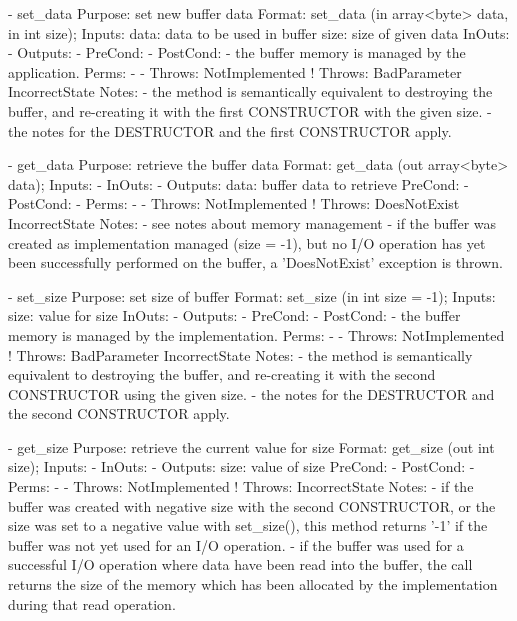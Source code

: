 \begin{myspec}
 
    - set_data
      Purpose:  set new buffer data
      Format:   set_data             (in  array<byte> data, 
                                      in  int         size);
      Inputs:   data:                 data to be used in buffer
                size:                 size of given data
      InOuts:   -
      Outputs:  -
      PreCond:  -
      PostCond: - the buffer memory is managed by the
                  application.
      Perms:    -
-     Throws:   NotImplemented
!     Throws:   BadParameter
                IncorrectState
      Notes:    - the method is semantically equivalent to
                  destroying the buffer, and re-creating it with
                  the first CONSTRUCTOR with the given size.
                - the notes for the DESTRUCTOR and the first
                  CONSTRUCTOR apply.
 
 
    - get_data
      Purpose:  retrieve the buffer data
      Format:   get_data             (out array<byte> data);
      Inputs:   -
      InOuts:   -
      Outputs:  data:                 buffer data to retrieve
      PreCond:  -
      PostCond: -
      Perms:    -
-     Throws:   NotImplemented
!     Throws:   DoesNotExist
                IncorrectState
      Notes:    - see notes about memory management
                - if the buffer was created as implementation
                  managed (size = -1), but no I/O operation has
                  yet been successfully performed on the buffer,
                  a 'DoesNotExist' exception is thrown.
 
 
    - set_size
      Purpose:  set size of buffer
      Format:   set_size           (in  int   size = -1);
      Inputs:   size:               value for size
      InOuts:   -
      Outputs:  -
      PreCond:  - 
      PostCond: - the buffer memory is managed by the
                  implementation.
      Perms:    -
-     Throws:   NotImplemented
!     Throws:   BadParameter
                IncorrectState
      Notes:    - the method is semantically equivalent to
                  destroying the buffer, and re-creating it with
                  the second CONSTRUCTOR using the given size.
                - the notes for the DESTRUCTOR and the second
                  CONSTRUCTOR apply.
 
 
    - get_size
      Purpose:  retrieve the current value for size
      Format:   get_size           (out int   size);
      Inputs:   -
      InOuts:   -
      Outputs:  size:              value of size
      PreCond:  -
      PostCond: -
      Perms:    -
-     Throws:   NotImplemented
!     Throws:   IncorrectState
      Notes:    - if the buffer was created with negative size
                  with the second CONSTRUCTOR, or the size was
                  set to a negative value with set_size(), this
                  method returns '-1' if the buffer was not yet
                  used for an I/O operation.  
                - if the buffer was used for a successful I/O
                  operation where data have been read into the
                  buffer, the call returns the size of the 
                  memory which has been allocated by the
                  implementation during that read operation.
 

\end{myspec}
